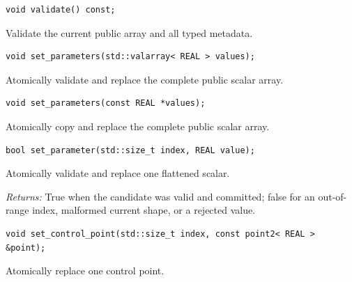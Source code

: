 \par\noindent\begin{minipage}{\linewidth}
\begin{lstlisting}[style=apireference]
void validate() const;
\end{lstlisting}
{\footnotesize Validate the current public array and all typed metadata.\par}
\end{minipage}\par\vspace{1pt}
\par\noindent\begin{minipage}{\linewidth}
\begin{lstlisting}[style=apireference]
void set_parameters(std::valarray< REAL > values);
\end{lstlisting}
{\footnotesize Atomically validate and replace the complete public scalar array.\par}
\end{minipage}\par\vspace{1pt}
\par\noindent\begin{minipage}{\linewidth}
\begin{lstlisting}[style=apireference]
void set_parameters(const REAL *values);
\end{lstlisting}
{\footnotesize Atomically copy and replace the complete public scalar array.\par}
\end{minipage}\par\vspace{1pt}
\par\noindent\begin{minipage}{\linewidth}
\begin{lstlisting}[style=apireference]
bool set_parameter(std::size_t index, REAL value);
\end{lstlisting}
{\footnotesize Atomically validate and replace one flattened scalar.\par}
{\footnotesize\textit{Returns:} True when the candidate was valid and committed; false for an out-of-range index, malformed current shape, or a rejected value.\par}
\end{minipage}\par\vspace{1pt}
\par\noindent\begin{minipage}{\linewidth}
\begin{lstlisting}[style=apireference]
void set_control_point(std::size_t index, const point2< REAL > &point);
\end{lstlisting}
{\footnotesize Atomically replace one control point.\par}
\end{minipage}\par\vspace{1pt}

